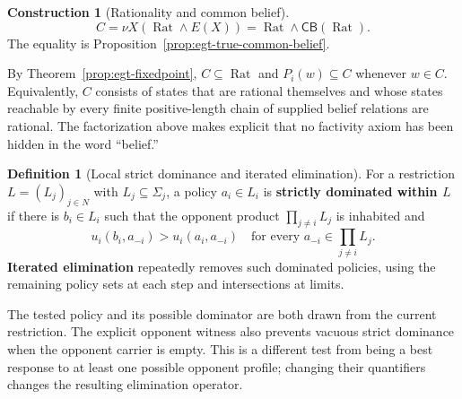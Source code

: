 \documentclass[11pt,a4paper]{article}
\numberwithin{equation}{section}
\theoremstyle{definition}
\newtheorem{definition}[theorem]{Definition}
\newtheorem{construction}[construction]{Construction}
\theoremstyle{remark}
\theoremstyle{plain}
\begin{document}
\begin{construction}[Rationality and common belief]
\begin{equation}\label{eq:egt-true-common-rationality}
 C=\nu X(\operatorname{Rat}\wedge E(X))
  =\operatorname{Rat}\wedge\mathsf{CB}(\operatorname{Rat}).
\end{equation}
The equality is Proposition~\ref{prop:egt-true-common-belief}.
\end{construction}

By Theorem~\ref{prop:egt-fixedpoint}, $C\subseteq\operatorname{Rat}$ and
$P_i(w)\subseteq C$ whenever $w\in C$. Equivalently, $C$ consists of states
that are rational themselves and whose states reachable by every finite
positive-length chain of supplied belief relations are rational. The
factorization above makes explicit that no factivity axiom has been hidden in
the word ``belief.''

\begin{definition}[Local strict dominance and iterated elimination]
\label{def:egt-strict-dominance}
For a restriction $L=(L_j)_{j\in N}$ with $L_j\subseteq\Sigma_j$, a policy
$a_i\in L_i$ is \textbf{strictly dominated within $L$} if there is
$b_i\in L_i$ such that the opponent product $\prod_{j\ne i}L_j$ is inhabited
and
\[
 u_i(b_i,a_{-i})>u_i(a_i,a_{-i})
 \quad\text{for every }a_{-i}\in\prod_{j\ne i}L_j.
\]
\textbf{Iterated elimination} repeatedly removes such dominated policies,
using the remaining policy sets at each step and intersections at limits.
\end{definition}

The tested policy and its possible dominator are both drawn from
the current restriction. The explicit opponent witness also prevents
vacuous strict dominance when the opponent carrier is empty. This is
a different test from being a best response to at least one possible
opponent profile; changing their quantifiers changes the resulting
elimination operator.
\end{document}

